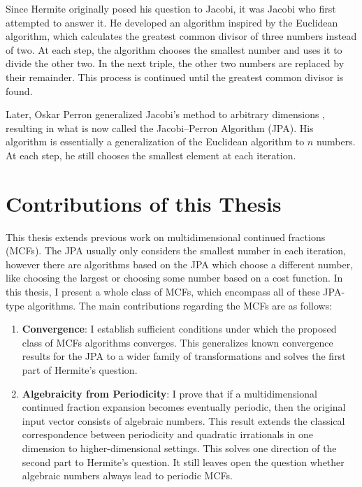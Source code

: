 Since Hermite originally posed his question to Jacobi, it was Jacobi who first attempted to answer it.
He developed an algorithm inspired by the Euclidean algorithm,
which calculates the greatest common divisor of three numbers instead of two.
At each step,
the algorithm chooses the smallest number and uses it to divide the other two.
In the next triple, the other two numbers are replaced by their remainder.
This process is continued until the greatest common divisor is found.

Later, Oskar Perron generalized Jacobi's method to arbitrary dimensions \cite{Perron07},
resulting in what is now called the Jacobi–Perron Algorithm (JPA).
His algorithm is essentially a generalization of the Euclidean algorithm to $n$ numbers.
At each step, he still chooses the smallest element at each iteration.


\section{Contributions of this Thesis}

This thesis extends previous work on multidimensional continued fractions (MCFs).
The JPA usually only considers the smallest number in each iteration,
however there are algorithms based on the JPA which choose a different number,
like choosing the largest or choosing some number based on a cost function.
In this thesis, I present a whole class of MCFs,
which encompass all of these JPA-type algorithms.
The main contributions regarding the MCFs are as follows:
\begin{enumerate}
  \item \textbf{Convergence}:
    I establish sufficient conditions under which the proposed class of MCFs
    algorithms converges.
    This generalizes known convergence results for the JPA to a wider family of
    transformations and solves the first part of Hermite's question.
  \item \textbf{Algebraicity from Periodicity}:
    I prove that if a multidimensional continued fraction expansion becomes
    eventually periodic, then the original input vector consists of algebraic
    numbers.
    This result extends the classical correspondence between periodicity and
    quadratic irrationals in one dimension to higher-dimensional settings.
    This solves one direction of the second part to Hermite's question.
    It still leaves open the question whether algebraic numbers always lead to
    periodic MCFs.
\end{enumerate}

